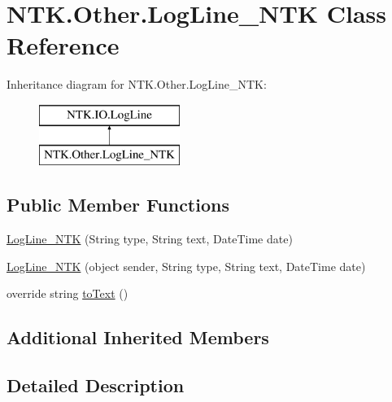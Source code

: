 \hypertarget{class_n_t_k_1_1_other_1_1_log_line___n_t_k}{}\section{N\+T\+K.\+Other.\+Log\+Line\+\_\+\+N\+TK Class Reference}
\label{class_n_t_k_1_1_other_1_1_log_line___n_t_k}


 


Inheritance diagram for N\+T\+K.\+Other.\+Log\+Line\+\_\+\+N\+TK\+:\begin{figure}[H]
\begin{center}
\leavevmode
\includegraphics[height=2.000000cm]{d1/db4/class_n_t_k_1_1_other_1_1_log_line___n_t_k}
\end{center}
\end{figure}
\subsection*{Public Member Functions}
\begin{DoxyCompactItemize}
\item 
\mbox{\hyperlink{class_n_t_k_1_1_other_1_1_log_line___n_t_k_a32e7f7e059d5fc7779c9f41e502552ad}{Log\+Line\+\_\+\+N\+TK}} (String type, String text, Date\+Time date)
\item 
\mbox{\hyperlink{class_n_t_k_1_1_other_1_1_log_line___n_t_k_a8c1b2fb66b387298efcdfada612a990b}{Log\+Line\+\_\+\+N\+TK}} (object sender, String type, String text, Date\+Time date)
\item 
override string \mbox{\hyperlink{class_n_t_k_1_1_other_1_1_log_line___n_t_k_a78909435926da4947cbd12f28f612a4c}{to\+Text}} ()
\end{DoxyCompactItemize}
\subsection*{Additional Inherited Members}


\subsection{Detailed Description}




